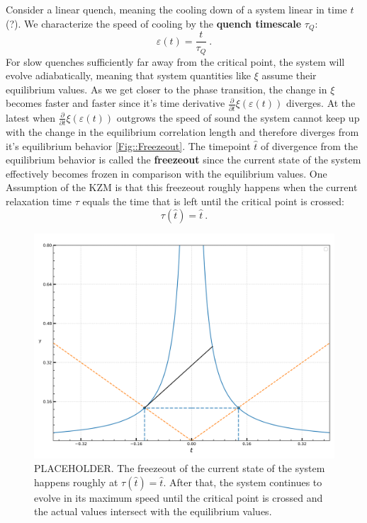 	Consider a linear quench, meaning the cooling down of a system linear in time $t$(?). We characterize the speed of cooling by the \textbf{quench timescale} $\tau_Q$:
	\begin{equation} \label{Eq::Linear-Quench}
		\varepsilon(t) =	\frac{t}{\tau_Q}~.
	\end{equation}
	For slow quenches sufficiently far away from the critical point, the system will evolve adiabatically, meaning that system quantities like $\xi$ assume their equilibrium values. As we get closer to the phase transition, the change in $\xi$ becomes faster and faster since it's time derivative $\frac{\partial}{\partial t} \xi(\varepsilon(t))$ diverges. At the latest when $\frac{\partial}{\partial t} \xi(\varepsilon(t))$ outgrows the speed of sound the system cannot keep up with the change in the equilibrium correlation length and therefore diverges from it's equilibrium behavior \autoref{Fig::Freezeout}. The timepoint $\hat{t}$ of divergence from the equilibrium behavior is called the \textbf{freezeout} since the current state of the system effectively becomes frozen in comparison with the equilibrium values. One Assumption of the KZM is that this freezeout roughly happens when the current relaxation time $\tau$ equals the time that is left until the critical point is crossed:
	\begin{equation}
		\tau(\hat{t}) = \hat{t}~.
	\end{equation}
	\begin{figure}[htp] 		
		\centering
		\includegraphics[width=0.7\linewidth]{graphics/xi-divergence-symmetric.png}
		\caption{PLACEHOLDER. The freezeout of the current state of the system happens roughly at $\tau(\hat{t}) =	\hat{t}$. After that, the system continues to evolve in its maximum speed until the critical point is crossed and the actual values intersect with the equilibrium values.}
		\label{Fig::Freezeout}
	\end{figure}
